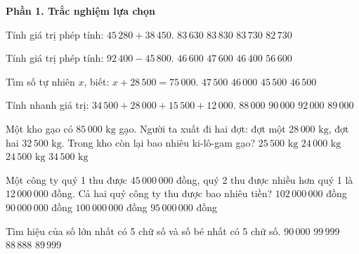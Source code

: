 \textbf{Phần 1. Trắc nghiệm lựa chọn}

\begin{ex} %
Tính giá trị phép tính: $45\,280 + 38\,450$.
\choice
{$83\,630$}
{$83\,830$}
{\True $83\,730$}
{$82\,730$}
\end{ex}

\begin{ex} %
Tính giá trị phép tính: $92\,400 - 45\,800$.
\choice
{\True $46\,600$}
{$47\,600$}
{$46\,400$}
{$56\,600$}
\end{ex}

\begin{ex} %
Tìm số tự nhiên $x$, biết: $x + 28\,500 = 75\,000$.
\choice
{$47\,500$}
{$46\,000$}
{$45\,500$}
{\True $46\,500$}
\end{ex}

\begin{ex} %
Tính nhanh giá trị: $34\,500 + 28\,000 + 15\,500 + 12\,000$.
\choice
{$88\,000$}
{\True $90\,000$}
{$92\,000$}
{$89\,000$}
\end{ex}

\begin{ex} %
Một kho gạo có $85\,000\text{ kg}$ gạo. Người ta xuất đi hai đợt: đợt một $28\,000\text{ kg}$, đợt hai $32\,500\text{ kg}$. Trong kho còn lại bao nhiêu ki-lô-gam gạo?
\choice
{$25\,500\text{ kg}$}
{$24\,000\text{ kg}$}
{\True $24\,500\text{ kg}$}
{$34\,500\text{ kg}$}
\end{ex}

\begin{ex} %
Một công ty quý 1 thu được $45\,000\,000$ đồng, quý 2 thu được nhiều hơn quý 1 là $12\,000\,000$ đồng. Cả hai quý công ty thu được bao nhiêu tiền?
\choice
{\True $102\,000\,000$ đồng}
{$90\,000\,000$ đồng}
{$100\,000\,000$ đồng}
{$95\,000\,000$ đồng}
\end{ex}

\begin{ex} %
Tìm hiệu của số lớn nhất có 5 chữ số và số bé nhất có 5 chữ số.
\choice
{$90\,000$}
{$99\,999$}
{$88\,888$}
{\True $89\,999$}
\end{ex}

